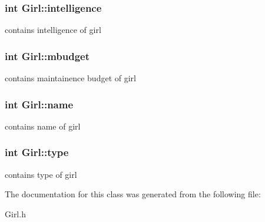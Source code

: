 \subsubsection[{\texorpdfstring{intelligence}{intelligence}}]{\setlength{\rightskip}{0pt plus 5cm}int Girl\+::intelligence}\hypertarget{classGirl_a751f8b9d8f1ba139d3f512eb198c16f4}{}\label{classGirl_a751f8b9d8f1ba139d3f512eb198c16f4}
contains intelligence of girl 
\subsubsection[{\texorpdfstring{mbudget}{mbudget}}]{\setlength{\rightskip}{0pt plus 5cm}int Girl\+::mbudget}\hypertarget{classGirl_a81c1cf79fd9153b32d73d0e1e34255fa}{}\label{classGirl_a81c1cf79fd9153b32d73d0e1e34255fa}
contains maintainence budget of girl 
\subsubsection[{\texorpdfstring{name}{name}}]{\setlength{\rightskip}{0pt plus 5cm}int Girl\+::name}\hypertarget{classGirl_ae05b0ddae0fdca022bd74a8060421b9c}{}\label{classGirl_ae05b0ddae0fdca022bd74a8060421b9c}
contains name of girl 
\subsubsection[{\texorpdfstring{type}{type}}]{\setlength{\rightskip}{0pt plus 5cm}int Girl\+::type}\hypertarget{classGirl_ac0242bb0ae7c23f69a75537437f76586}{}\label{classGirl_ac0242bb0ae7c23f69a75537437f76586}
contains type of girl 

The documentation for this class was generated from the following file\+:\begin{DoxyCompactItemize}
\item 
Girl.\+h\end{DoxyCompactItemize}
